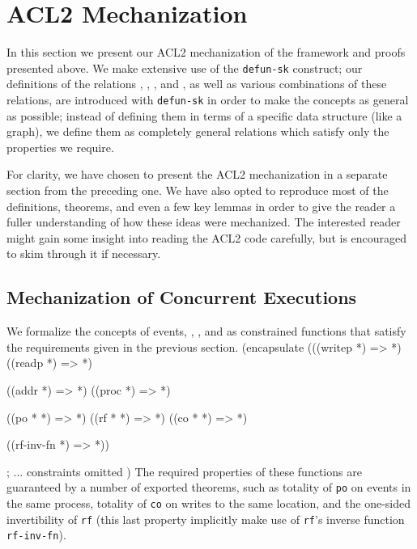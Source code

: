 \documentclass[]{eptcs}
\newenvironment{qv}
{\quote\Verbatim}
{\endVerbatim\endquote}
\begin{document}
\section{ACL2 Mechanization}

In this section we present our ACL2 mechanization of the framework and proofs presented above. We make extensive use of the \verb|defun-sk| construct; our definitions of the relations , , , and , as well as various combinations of these relations, are introduced with \verb|defun-sk| in order to make the concepts as general as possible; instead of defining them in terms of a specific data structure (like a graph), we define them as completely general relations which satisfy only the properties we require.

For clarity, we have chosen to present the ACL2 mechanization in a separate section from the preceding one. We have also opted to reproduce most of the definitions, theorems, and even a few key lemmas in order to give the reader a fuller understanding of how these ideas were mechanized. The interested reader might gain some insight into reading the ACL2 code carefully, but is encouraged to skim through it if necessary.

\subsection{Mechanization of Concurrent Executions}

We formalize the concepts of events, , , and  as constrained functions that satisfy the requirements given in the previous section.
\begin{qv}
(encapsulate
 (((writep *) => *)
  ((readp *) => *)

  ((addr *) => *)
  ((proc *) => *)

  ((po * *) => *)
  ((rf * *) => *)
  ((co * *) => *)
  
  ((rf-inv-fn *) => *))
  
  ; ... constraints omitted
)
\end{qv}
The required properties of these functions are guaranteed by a number of exported theorems, such as totality of \verb|po| on events in the same process, totality of \verb|co| on writes to the same location, and the one-sided invertibility of \verb|rf| (this last property implicitly make use of \verb|rf|'s inverse function \verb|rf-inv-fn|).
\end{document}
